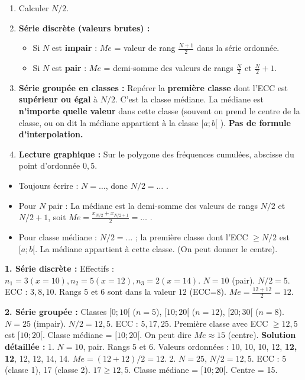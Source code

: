\documentclass[11pt]{article}
\newcommand{\cle}[1]{{\popxbold\color{popdark}#1}}
\begin{document}
\begin{methode}
\begin{enumerate}
    \item Calculer $N/2$.
    \item \textbf{Série discrète (valeurs brutes) :}
    \begin{itemize}
        \item Si $N$ est \textbf{impair} : $Me$ = valeur de rang $\frac{N+1}{2}$ dans la série ordonnée.
        \item Si $N$ est \textbf{pair} : $Me$ = demi-somme des valeurs de rangs $\frac{N}{2}$ et $\frac{N}{2}+1$.
    \end{itemize}
    \item \textbf{Série groupée en classes :} Repérer la \textbf{première classe} dont l'ECC est \textbf{supérieur ou égal} à $N/2$. C'est la \cle{classe médiane}. La médiane est \textbf{n'importe quelle valeur} dans cette classe (souvent on prend le centre de la classe, ou on dit \og la médiane appartient à la classe $[a;b[$ \fg). \textbf{Pas de formule d'interpolation.}
    \item \textbf{Lecture graphique :} Sur le polygone des fréquences cumulées, abscisse du point d'ordonnée $0,5$.
\end{enumerate}
\end{methode}

\begin{attention}
\begin{itemize}
    \item Toujours écrire : \og $N = \dots$, donc $N/2 = \dots$ \fg.
    \item Pour $N$ pair : \og La médiane est la demi-somme des valeurs de rangs $N/2$ et $N/2+1$, soit $Me = \frac{x_{N/2} + x_{N/2+1}}{2} = \dots$ \fg.
    \item Pour classe médiane : \og $N/2 = \dots$ ; la première classe dont l'ECC $\ge N/2$ est $[a;b[$. La médiane appartient à cette classe. \fg (On peut donner le centre).
\end{itemize}
\end{attention}

\begin{exoresolu}
\textbf{1. Série discrète :} Effectifs : $n_1=3 (x=10), n_2=5 (x=12), n_3=2 (x=14)$. $N=10$ (pair). $N/2=5$.
ECC : $3, 8, 10$. Rangs 5 et 6 sont dans la valeur $12$ (ECC=8). $Me = \frac{12+12}{2} = 12$.

\textbf{2. Série groupée :} Classes $[0;10[$ ($n=5$), $[10;20[$ ($n=12$), $[20;30[$ ($n=8$). $N=25$ (impair). $N/2=12,5$.
ECC : $5, 17, 25$. Première classe avec ECC $\ge 12,5$ est $[10;20[$. Classe médiane = $[10;20[$. On peut dire $Me \approx 15$ (centre).
\tcblower
\textbf{Solution détaillée :}
1. $N=10$, pair. Rangs 5 et 6. Valeurs ordonnées : 10, 10, 10, 12, \textbf{12, 12}, 12, 12, 14, 14. $Me = (12+12)/2 = 12$.
2. $N=25$, $N/2=12,5$. ECC : 5 (classe 1), 17 (classe 2). $17 \ge 12,5$. Classe médiane = $[10;20[$. Centre = 15.
\end{exoresolu}
\end{document}
